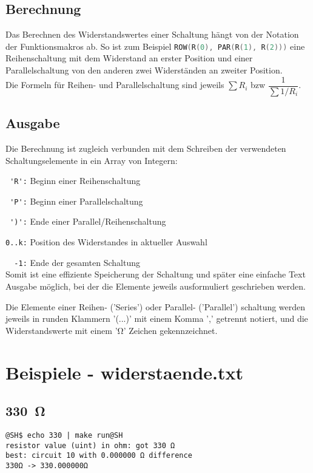 \documentclass[a4paper,10pt,ngerman]{scrartcl}
\newcommand{\myohm}[1]{\SI{#1}{\ohm}}
\begin{document}
\subsection{Berechnung}
Das Berechnen des Widerstandswertes einer Schaltung hängt von der Notation der Funktionsmakros ab. So ist zum Beispiel \lstinline[language=C++]{ROW(R(0), PAR(R(1), R(2)))} eine Reihenschaltung mit dem Widerstand an erster Position und einer Parallelschaltung von den anderen zwei Widerständen an zweiter Position. \\
Die Formeln für Reihen- und Parallelschaltung sind jeweils $\sum\nolimits R_i$  bzw  $\dfrac{1}{\sum\nolimits 1/R_i}$.

\subsection{Ausgabe}
Die Berechnung ist zugleich verbunden mit dem Schreiben der verwendeten Schaltungselemente in ein Array von Integern:

\lstinline{ 'R':} Beginn einer Reihenschaltung

\lstinline{ 'P':} Beginn einer Parallelschaltung

\lstinline{ ')':} Ende einer Parallel/Reihenschaltung

\lstinline{0..k:} Position des Widerstandes in aktueller Auswahl

\lstinline{  -1:} Ende der gesamten Schaltung \\
Somit ist eine effiziente Speicherung der Schaltung und später eine einfache Text Ausgabe möglich, bei der die Elemente jeweils ausformuliert geschrieben werden.

Die Elemente einer Reihen- ('Series') oder Parallel- ('Parallel') schaltung werden jeweils in runden Klammern '(...)' mit einem Komma ',' getrennt notiert, und die Widerstandswerte mit einem '\si{\ohm}' Zeichen gekennzeichnet.


\pagebreak
\section[Beispiele]{Beispiele - widerstaende.txt}

\subsection{\myohm{330}}
\begin{lstlisting}
@SH$ echo 330 | make run@SH
resistor value (uint) in ohm: got 330 Ω
best: circuit 10 with 0.000000 Ω difference
330Ω -> 330.000000Ω
\end{lstlisting}
\end{document}
